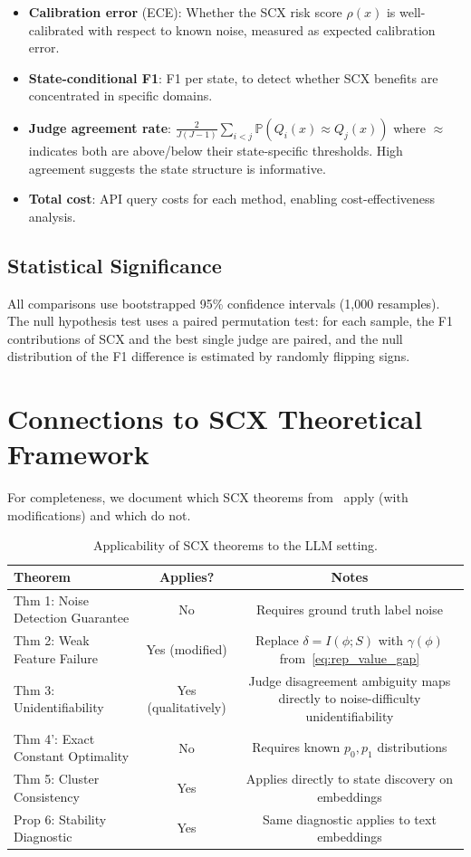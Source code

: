 \documentclass[11pt]{article}
\begin{document}
\begin{itemize}
    \item \textbf{Calibration error} (ECE): Whether the SCX risk score $\rho(x)$ is well-calibrated with respect to known noise, measured as expected calibration error.
    \item \textbf{State-conditional F1}: F1 per state, to detect whether SCX benefits are concentrated in specific domains.
    \item \textbf{Judge agreement rate}: $\frac{2}{J(J-1)} \sum_{i<j} \mathbb{P}(Q_i(x) \approx Q_j(x))$ where $\approx$ indicates both are above/below their state-specific thresholds. High agreement suggests the state structure is informative.
    \item \textbf{Total cost}: API query costs for each method, enabling cost-effectiveness analysis.
\end{itemize}

\subsection{Statistical Significance}

All comparisons use bootstrapped 95\% confidence intervals (1,000 resamples). The null hypothesis test uses a paired permutation test: for each sample, the F1 contributions of SCX and the best single judge are paired, and the null distribution of the F1 difference is estimated by randomly flipping signs.

\section{Connections to SCX Theoretical Framework}

For completeness, we document which SCX theorems from~\cite{scx2026} apply (with modifications) and which do not.

\begin{table}[h]
\centering
\caption{Applicability of SCX theorems to the LLM setting.}
\label{tab:theorem_applicability}
\begin{tabular}{@{}lcc@{}}
\toprule
\textbf{Theorem} & \textbf{Applies?} & \textbf{Notes} \\
\midrule
Thm 1: Noise Detection Guarantee & No & Requires ground truth label noise \\
Thm 2: Weak Feature Failure & Yes (modified) & Replace $\delta = I(\phi; S)$ with $\gamma(\phi)$ from~\eqref{eq:rep_value_gap} \\
Thm 3: Unidentifiability & Yes (qualitatively) & Judge disagreement ambiguity maps directly to noise-difficulty unidentifiability \\
Thm 4': Exact Constant Optimality & No & Requires known $p_0, p_1$ distributions \\
Thm 5: Cluster Consistency & Yes & Applies directly to state discovery on embeddings \\
Prop 6: Stability Diagnostic & Yes & Same diagnostic applies to text embeddings \\
\bottomrule
\end{tabular}
\end{table}
\end{document}
